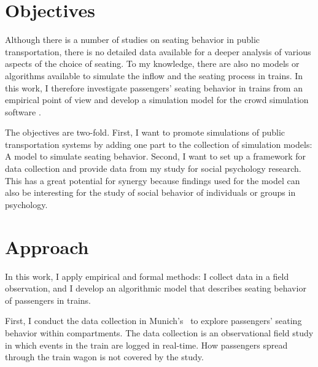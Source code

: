 



\section{Objectives}

Although there is a number of studies on seating behavior in public
transportation, there is no detailed data available for a deeper analysis of
various aspects of the choice of seating.
To my knowledge, there are also no models or algorithms available to simulate
the inflow and the seating process in trains.
In this work, I therefore investigate passengers' seating behavior in trains
from an empirical point of view and develop a simulation model for the crowd
simulation software \vadere.

The objectives are two-fold.
First, I want to promote simulations of public transportation systems by
adding one part to the collection of simulation models: A model to simulate
seating behavior.
Second, I want to set up a framework for data collection and provide data from
my study for social psychology research.
This has a great potential for synergy because findings used for the model can
also be interesting for the study of social behavior of individuals or groups
in psychology.

\section{Approach}

In this work, I apply empirical and formal methods:
I collect data in a field observation, and I develop an algorithmic model that
describes seating behavior of passengers in trains.

First, I conduct the data collection in Munich's \sbahn\ to explore passengers'
seating behavior within compartments.
The data collection is an observational field study in which events in the train
are logged in real-time.
How passengers spread through the train wagon is not covered by the study.

